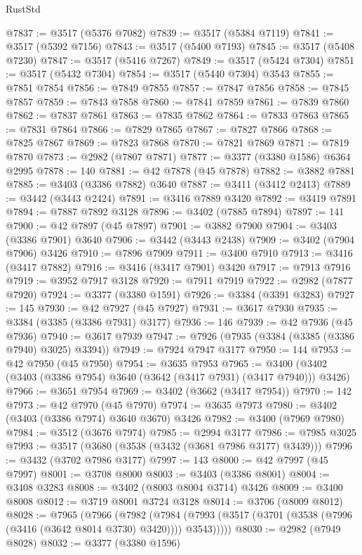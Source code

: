 \begin{lexlean}{RustStd}
\begin{coremodule}
@7837 := @3517 (@5376 @7082)
@7839 := @3517 (@5384 @7119)
@7841 := @3517 (@5392 @7156)
@7843 := @3517 (@5400 @7193)
@7845 := @3517 (@5408 @7230)
@7847 := @3517 (@5416 @7267)
@7849 := @3517 (@5424 @7304)
@7851 := @3517 (@5432 @7304)
@7854 := @3517 (@5440 @7304) @3543
@7855 := @7851 @7854
@7856 := @7849 @7855
@7857 := @7847 @7856
@7858 := @7845 @7857
@7859 := @7843 @7858
@7860 := @7841 @7859
@7861 := @7839 @7860
@7862 := @7837 @7861
@7863 := @7835 @7862
@7864 := @7833 @7863
@7865 := @7831 @7864
@7866 := @7829 @7865
@7867 := @7827 @7866
@7868 := @7825 @7867
@7869 := @7823 @7868
@7870 := @7821 @7869
@7871 := @7819 @7870
@7873 := @2982 (@7807 @7871)
@7877 := @3377 (@3380 @1586) @6364 @2995
@7878 := 140
@7881 := @42 @7878 (@45 @7878)
@7882 := @3882 @7881
@7885 := @3403 (@3386 @7882) @3640
@7887 := @3411 (@3412 @2413)
@7889 := @3442 (@3443 @2424)
@7891 := @3416 @7889 @3420
@7892 := @3419 @7891
@7894 := @7887 @7892 @3128
@7896 := @3402 (@7885 @7894)
@7897 := 141
@7900 := @42 @7897 (@45 @7897)
@7901 := @3882 @7900
@7904 := @3403 (@3386 @7901) @3640
@7906 := @3442 (@3443 @2438)
@7909 := @3402 (@7904 @7906) @3426
@7910 := @7896 @7909
@7911 := @3400 @7910
@7913 := @3416 (@3417 @7882)
@7916 := @3416 (@3417 @7901) @3420
@7917 := @7913 @7916
@7919 := @3952 @7917 @3128
@7920 := @7911 @7919
@7922 := @2982 (@7877 @7920)
@7924 := @3377 (@3380 @1591)
@7926 := @3384 (@3391 @3283)
@7927 := 145
@7930 := @42 @7927 (@45 @7927)
@7931 := @3617 @7930
@7935 := @3384 (@3385 (@3386 @7931) @3177)
@7936 := 146
@7939 := @42 @7936 (@45 @7936)
@7940 := @3617 @7939
@7947 := @7926 (@7935 (@3384 (@3385 (@3386 @7940) @3025) @3394))
@7949 := @7924 @7947 @3177
@7950 := 144
@7953 := @42 @7950 (@45 @7950)
@7954 := @3635 @7953
@7965 := @3400 (@3402 (@3403 (@3386 @7954) @3640 (@3642 (@3417 @7931) (@3417 @7940))) @3426)
@7966 := @3651 @7954
@7969 := @3402 (@3662 (@3417 @7954))
@7970 := 142
@7973 := @42 @7970 (@45 @7970)
@7974 := @3635 @7973
@7980 := @3402 (@3403 (@3386 @7974) @3640 @3670) @3426
@7982 := @3400 (@7969 @7980)
@7984 := @3512 (@3676 @7974)
@7985 := @2994 @3177
@7986 := @7985 @3025
@7993 := @3517 (@3680 (@3538 (@3432 (@3681 @7986 @3177) @3439)))
@7996 := @3432 (@3702 @7986 @3177)
@7997 := 143
@8000 := @42 @7997 (@45 @7997)
@8001 := @3708 @8000
@8003 := @3403 (@3386 @8001)
@8004 := @3408 @3283
@8008 := @3402 (@8003 @8004 @3714) @3426
@8009 := @3400 @8008
@8012 := @3719 @8001 @3724 @3128
@8014 := @3706 (@8009 @8012)
@8028 := @7965
    (@7966
      (@7982
        (@7984 (@7993 (@3517 (@3701 (@3538 (@7996 (@3416 (@3642 @8014 @3730) @3420)))) @3543)))))
@8030 := @2982 (@7949 @8028)
@8032 := @3377 (@3380 @1596)

\end{coremodule}
\end{lexlean}
